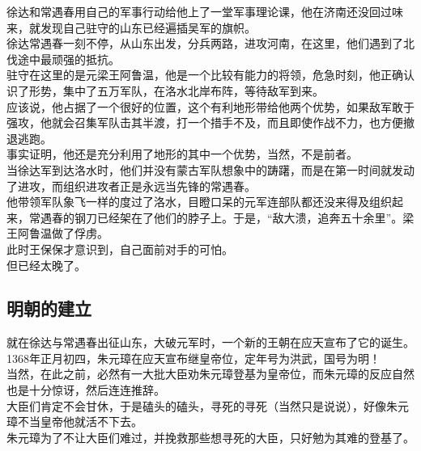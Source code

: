 \begin{multicols}{\theparacolNo}
徐达和常遇春用自己的军事行动给他上了一堂军事理论课，他在济南还没回过味来，就发现自己驻守的山东已经遍插吴军的旗帜。\\

徐达常遇春一刻不停，从山东出发，分兵两路，进攻河南，在这里，他们遇到了北伐途中最顽强的抵抗。\\

驻守在这里的是元梁王阿鲁温，他是一个比较有能力的将领，危急时刻，他正确认识了形势，集中了五万军队，在洛水北岸布阵，等待敌军到来。\\

应该说，他占据了一个很好的位置，这个有利地形带给他两个优势，如果敌军敢于强攻，他就会召集军队击其半渡，打一个措手不及，而且即使作战不力，也方便撤退逃跑。\\

事实证明，他还是充分利用了地形的其中一个优势，当然，不是前者。\\

当徐达军到达洛水时，他们并没有蒙古军队想象中的踌躇，而是在第一时间就发动了进攻，而组织进攻者正是永远当先锋的常遇春。\\

他带领军队象飞一样的度过了洛水，目瞪口呆的元军连部队都还没来得及组织起来，常遇春的钢刀已经架在了他们的脖子上。于是，“敌大溃，追奔五十余里”。梁王阿鲁温做了俘虏。\\

此时王保保才意识到，自己面前对手的可怕。\\

但已经太晚了。\\

\subsection{明朝的建立}
就在徐达与常遇春出征山东，大破元军时，一个新的王朝在应天宣布了它的诞生。\\

1368年正月初四，朱元璋在应天宣布继皇帝位，定年号为洪武，国号为明！\\

当然，在此之前，必然有一大批大臣劝朱元璋登基为皇帝位，而朱元璋的反应自然也是十分惊讶，然后连连推辞。\\

大臣们肯定不会甘休，于是磕头的磕头，寻死的寻死（当然只是说说），好像朱元璋不当皇帝他就活不下去。\\

朱元璋为了不让大臣们难过，并挽救那些想寻死的大臣，只好勉为其难的登基了。\\


\end{multicols}
